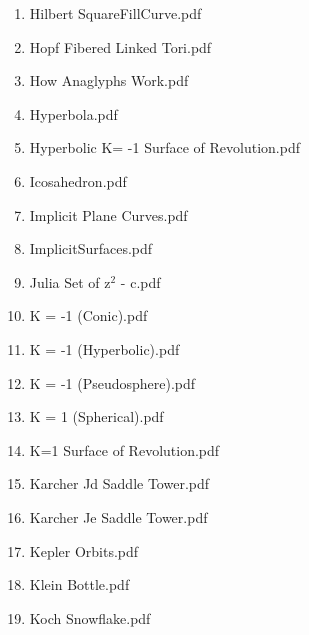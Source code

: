 \documentclass[11pt]{article}
\begin{document}
\begin{enumerate}
\begin{enumerate}
\item Hilbert SquareFillCurve.pdf
\label{sec-1-1-1-1-29-20-55}

\item Hopf Fibered Linked Tori.pdf
\label{sec-1-1-1-1-29-20-56}

\item How Anaglyphs Work.pdf
\label{sec-1-1-1-1-29-20-57}

\item Hyperbola.pdf
\label{sec-1-1-1-1-29-20-58}

\item Hyperbolic K= -1 Surface of Revolution.pdf
\label{sec-1-1-1-1-29-20-59}

\item Icosahedron.pdf
\label{sec-1-1-1-1-29-20-60}

\item Implicit Plane Curves.pdf
\label{sec-1-1-1-1-29-20-61}

\item ImplicitSurfaces.pdf
\label{sec-1-1-1-1-29-20-62}

\item Julia Set of  z$^{\text{2}}$ - c.pdf
\label{sec-1-1-1-1-29-20-63}

\item K = -1  (Conic).pdf
\label{sec-1-1-1-1-29-20-64}

\item K = -1  (Hyperbolic).pdf
\label{sec-1-1-1-1-29-20-65}

\item K = -1  (Pseudosphere).pdf
\label{sec-1-1-1-1-29-20-66}

\item K = 1  (Spherical).pdf
\label{sec-1-1-1-1-29-20-67}

\item K=1 Surface of Revolution.pdf
\label{sec-1-1-1-1-29-20-68}

\item Karcher Jd Saddle Tower.pdf
\label{sec-1-1-1-1-29-20-69}

\item Karcher Je Saddle Tower.pdf
\label{sec-1-1-1-1-29-20-70}

\item Kepler Orbits.pdf
\label{sec-1-1-1-1-29-20-71}

\item Klein Bottle.pdf
\label{sec-1-1-1-1-29-20-72}

\item Koch Snowflake.pdf
\label{sec-1-1-1-1-29-20-73}


\end{enumerate}
\end{enumerate}
\end{document}
